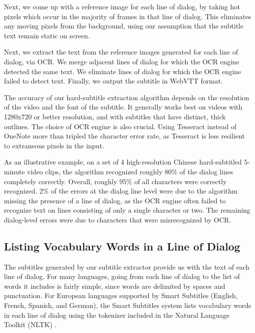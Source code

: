 \documentclass{sigchi}
\begin{document}
Next, we come up with a reference image for each line of dialog, by taking hot pixels which occur in the majority of frames in that line of dialog. This eliminates any moving pixels from the background, using our
assumption that the subtitle text remain static on screen.

Next, we extract the text from the reference images generated for each line of dialog, via OCR. We merge adjacent lines of dialog for which the OCR engine detected the same text. We eliminate lines of dialog for which the OCR engine failed to detect text. Finally, we output the subtitle in WebVTT format.

The accuracy of our hard-subtitle extraction algorithm depends on the resolution of the video and
the font of the subtitle. It generally works best on videos with 1280x720 or better resolution, and with subtitles that have distinct, thick outlines. The choice of OCR engine is also crucial. Using Tesseract instead of OneNote more than tripled the character error rate,
as Tesseract is less resilient to extraneous pixels in the input.

As an illustrative example, on a set of 4 high-resolution Chinese hard-subtitled 5-minute video clips, the algorithm recognized roughly 80\% of the dialog lines completely correctly. Overall, roughly 95\% of all characters were correctly recognized. 2\% of the errors at the dialog line level were due to the algorithm missing the presence of a line of dialog, as the OCR engine often failed to recognize text on lines consisting of only a single character or two. The remaining dialog-level errors were due to characters that were misrecognized by OCR.


\subsection{Listing Vocabulary Words in a Line of Dialog}

The subtitles generated by our subtitle extractor provide us with the text of each line of dialog. For many languages,
going from each line of dialog to the list of words it includes is fairly simple, since words are
delimited by spaces and punctuation. For European languages supported by
Smart Subtitles (English, French, Spanish, and German), the Smart Subtitles system lists
vocabulary words in each line of dialog using the
tokenizer included in the Natural
Language Toolkit (NLTK) \cite{nltk}.
\end{document}
